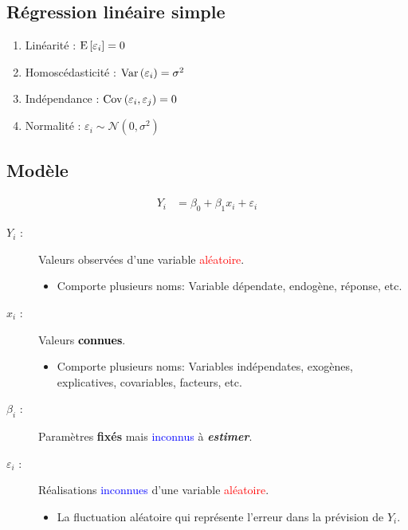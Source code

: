 \documentclass[10pt, french]{article}
\begin{document}
\begin{multicols*}{3}
\section{Régression linéaire simple}
\begin{algo2}[Postulats]
\begin{enumerate}[label=$\mathbf{H}_{\arabic*}$]
\item Linéarité : $\mathrm{E} \left[ \varepsilon_i \right] = 0$
\item Homoscédasticité : $\mathrm{Var} \left( \varepsilon_i \right)= \sigma^2$
\item Indépendance : $\mathrm{Cov} \left( \varepsilon_i, \varepsilon_j \right) = 0$
\item Normalité : $\varepsilon_i \sim \mathcal{N} (0, \sigma^2)$
\end{enumerate}
\end{algo2}
\subsection*{Modèle}

\begin{definitionNOHFILL}
\begin{align*}
	Y_{i} 
	&=	\beta_{0} + \beta_{1} x_{i} + \varepsilon_{i}
\end{align*}
\end{definitionNOHFILL}

\begin{distributions}
\begin{description}
	\item[$Y_i$ : ] Valeurs observées d'une variable \textcolor{red}{aléatoire}.
		\begin{itemize}[leftmargin = *]
		\item	Comporte plusieurs noms: Variable dépendate, endogène, réponse, etc.
		\end{itemize}
	\item[$x_i$ : ] Valeurs \textcolor{black}{\textbf{connues}}.
		\begin{itemize}[leftmargin = *]
		\item	Comporte plusieurs noms: Variables indépendates, exogènes, explicatives, covariables, facteurs, etc.
		\end{itemize}
	\item[$\beta_i$ : ] Paramètres \textbf{fixés} mais \textcolor{blue}{inconnus} à \textit{\textbf{estimer}}.
	\item[$\varepsilon_i$ : ] Réalisations \textcolor{blue}{inconnues} d'une variable \textcolor{red}{aléatoire}.
		\begin{itemize}[leftmargin = *]
		\item	La fluctuation aléatoire qui représente l'erreur dans la prévision de $Y_{i}$.
		\end{itemize}
\end{description}
\end{distributions}


\end{multicols*}
\end{document}
